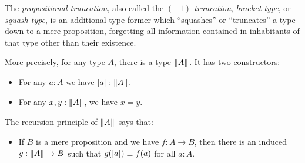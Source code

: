 \documentclass[hott-all.tex]{subfiles}
\begin{document}

The \emph{propositional truncation}, also called the \emph{$(-1)$-truncation},
\emph{bracket type}, or \emph{squash type}, is an additional type former which
``squashes'' or ``truncates'' a type down to a mere proposition, forgetting all
information contained in inhabitants of that type other than their existence.

More precisely, for any type $A$, there is a type $\mathopen{}\left\Vert A\right\Vert_{}\mathclose{}$.
It has two constructors:
\begin{itemize}
\item For any $a:A$ we have $\mathopen{}\left|a\right|_{}^{}\mathclose{} : \mathopen{}\left\Vert A\right\Vert_{}\mathclose{}$.
\item For any $x,y:\mathopen{}\left\Vert A\right\Vert_{}\mathclose{}$, we have $x=y$.
\end{itemize}


The recursion principle of $\mathopen{}\left\Vert A\right\Vert_{}\mathclose{}$ says that:
\begin{itemize}
\item If $B$ is a mere proposition and we have $f:A\to B$, then there is an
induced $g:\mathopen{}\left\Vert A\right\Vert_{}\mathclose{} \to B$ such that $g(\mathopen{}\left|a\right|_{}^{}\mathclose{}) \equiv f(a)$ for all $a:A$.
\end{itemize}

\end{document}
